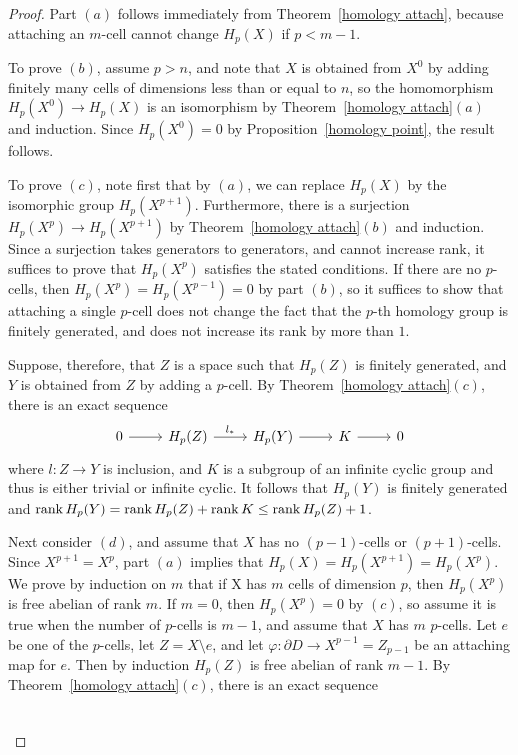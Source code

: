 \begin{proof}
Part $(a)$ follows immediately from Theorem~\ref{homology attach}, because attaching an $m$-cell cannot change $H_p(X)$ if $p<m-1$.\par
To prove $(b)$, assume $p>n$, and note that $X$ is obtained from $X^0$ by adding finitely many cells of dimensions less than or equal to $n$, so the homomorphism $H_p(X^0)\to H_p(X)$ is an isomorphism by Theorem~\ref{homology attach}$(a)$ and induction. Since $H_p(X^0)=0$ by Proposition~\ref{homology point}, the result follows.\par
To prove $(c)$, note first that by $(a)$, we can replace $H_p(X)$ by the isomorphic group $H_p(X^{p+1})$. Furthermore, there is a surjection $H_p(X^p)\to H_p(X^{p+1})$ by Theorem~\ref{homology attach}$(b)$ and induction. Since a surjection takes generators to generators, and cannot increase rank, it suffices to prove that $H_p(X^p)$ satisfies the stated conditions. If there are no $p$-cells, then $H_p(X^p)=H_p(X^{p-1})=0$ by part $(b)$, so it suffices to show that attaching a single $p$-cell does not change the fact that the $p$-th homology group is finitely generated, and does not increase its rank
by more than $1$.\par
Suppose, therefore, that $Z$ is a space such that $H_p(Z)$ is finitely generated, and $Y$ is obtained from $Z$ by adding a $p$-cell. By Theorem~\ref{homology attach}$(c)$, there is an exact
sequence
\[\begin{tikzcd}
0\ar[r]&H_p(Z)\ar[r,"l_*"]&H_p(Y)\ar[r]&K\ar[r]&0
\end{tikzcd}\]
where $l:Z\to Y$ is inclusion, and $K$ is a subgroup of an infinite cyclic group and thus is either trivial or infinite cyclic. It follows that $H_p(Y)$ is finitely 
generated and $\mathrm{rank}\, H_p(Y)=\mathrm{rank}\, H_p(Z)+\mathrm{rank}\, K\leq\mathrm{rank}\, H_p(Z)+1$.\par
Next consider $(d)$, and assume that $X$ has no $(p-1)$-cells or $(p+1)$-cells. Since $X^{p+1}=X^p$, part $(a)$ implies that $H_p(X)=H_p(X^{p+1})=H_p(X^p)$. We prove 
by induction on $m$ that if X has $m$ cells of dimension $p$, then $H_p(X^p)$ is free abelian of rank $m$. If $m=0$, then $H_p(X^p)=0$ by $(c)$, so assume it is true 
when the number of $p$-cells is $m-1$, and assume that $X$ has $m$ $p$-cells. Let $e$ be one of the $p$-cells, let $Z=X\setminus e$, and let 
$\varphi:\partial D\to X^{p-1}=Z_{p-1}$ be an attaching map for $e$. Then by induction $H_p(Z)$ is free abelian of rank $m-1$. By Theorem~\ref{homology attach}$(c)$, 
there is an exact sequence
\[\begin{tikzcd}

\end{tikzcd}\]
\end{proof}
